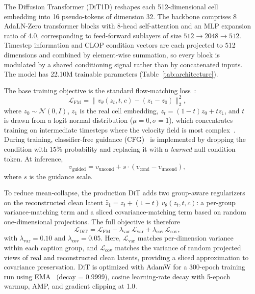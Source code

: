 The Diffusion Transformer (DiT1D) reshapes each 512-dimensional cell embedding into 16 pseudo-tokens of dimension 32. The backbone comprises 8 AdaLN-Zero transformer blocks with 8-head self-attention and an MLP expansion ratio of 4.0, corresponding to feed-forward sublayers of size $512 \to 2048 \to 512$. Timestep information and CLOP condition vectors are each projected to 512 dimensions and combined by element-wise summation, so every block is modulated by a shared conditioning signal rather than by concatenated inputs. The model has 22.10M trainable parameters (Table~\ref{tab:architecture}).

The base training objective is the standard flow-matching loss~\citep{ref-flow-matching,ref-ot-cfm}:
\begin{equation}
\mathcal{L}_\text{FM} = \| v_\theta(z_t, t, c) - (z_1 - z_0) \|_2^2,
\label{eq:fm}
\end{equation}
where $z_0 \sim \mathcal{N}(0, I)$, $z_1$ is the real cell embedding, $z_t = (1-t)z_0 + tz_1$, and $t$ is drawn from a logit-normal distribution ($\mu{=}0, \sigma{=}1$), which concentrates training on intermediate timesteps where the velocity field is most complex~\citep{ref-sd3}. During training, classifier-free guidance (CFG)~\citep{ref-cfg} is implemented by dropping the condition with 15\% probability and replacing it with a \emph{learned} null condition token. At inference,
\begin{equation}
v_\text{guided} = v_\text{uncond} + s \cdot (v_\text{cond} - v_\text{uncond}),
\label{eq:cfg}
\end{equation}
where $s$ is the guidance scale.

To reduce mean-collapse, the production DiT adds two group-aware regularizers on the reconstructed clean latent $\hat{z}_1 = z_t + (1-t)\,v_\theta(z_t,t,c)$: a per-group variance-matching term and a sliced covariance-matching term based on random one-dimensional projections. The full objective is therefore
\begin{equation}
\mathcal{L}_\text{DiT} = \mathcal{L}_\text{FM} + \lambda_\text{var}\,\mathcal{L}_\text{var} + \lambda_\text{cov}\,\mathcal{L}_\text{cov},
\label{eq:var-loss}
\end{equation}
with $\lambda_\text{var}=0.10$ and $\lambda_\text{cov}=0.05$. Here, $\mathcal{L}_\text{var}$ matches per-dimension variance within each caption group, and $\mathcal{L}_\text{cov}$ matches the variance of random projected views of real and reconstructed clean latents, providing a sliced approximation to covariance preservation. DiT is optimized with AdamW for a 300-epoch training run using EMA~\citep{ref-ema} (decay = 0.9999), cosine learning-rate decay with 5-epoch warmup, AMP, and gradient clipping at 1.0.

